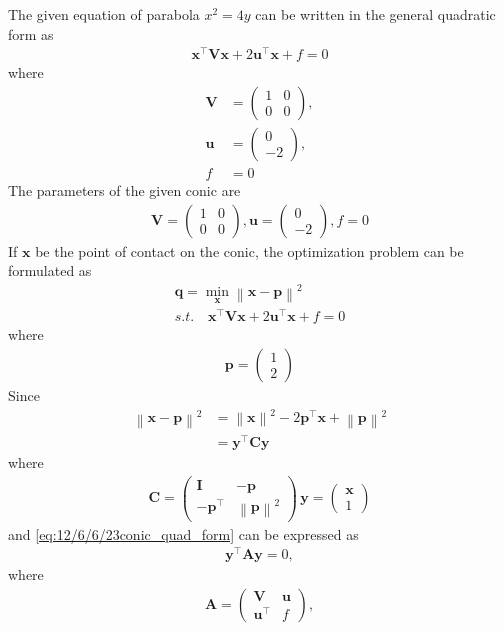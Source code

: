 \documentclass[journal,10pt,twocolumn]{article}
\providecommand{\norm}[1]{\left\lVert#1\right\rVert}
\let\vec\mathbf
\newcommand{\myvec}[1]{\ensuremath{\begin{pmatrix}#1\end{pmatrix}}}
\begin{document}
The given equation of parabola $x^2 = 4y$ can be written in the general quadratic form as
\begin{align}
    \label{eq:conic_quad_form}
    \vec{x}^{\top}\vec{V}\vec{x}+2\vec{u}^{\top}\vec{x}+f=0
    \end{align}
where
\begin{align}
	\label{eq:V_matrix}
	\vec{V} &= \myvec{1 & 0\\0 & 0},
	\\
	\label{eq:u_vector}
	\vec{u} &= \myvec{0\\-2},
	\\
	\label{eq:f_value}
	f &=0
\end{align}
\fi
The parameters of the given conic are
\begin{align}
	\label{eq:12/6/6/23V_matrix}
	\vec{V} = \myvec{1 & 0\\0 & 0},
	\vec{u} = \myvec{0\\-2},
	f =0
\end{align}
If $\vec{x}$ be the point of contact on the conic, the optimization problem can be formulated as 
\begin{align}
	\label{eq:12/6/6/23/quad}
	\vec{q} = \min_{\vec{x}}\norm{\vec{x}-\vec{p}}^2
	\\
	s.t. \quad 
    \vec{x}^{\top}\vec{V}\vec{x}+2\vec{u}^{\top}\vec{x}+f=0
    \label{eq:12/6/6/23conic_quad_form}
\end{align}
%
where 
\begin{align}
	\vec{p} = \myvec{1 \\ 2}
\end{align}
Since 
\begin{align}
	\norm{\vec{x}-\vec{p}}^2 &= 
	\norm{\vec{x}}^2 - 2\vec{p}^{\top}\vec{x} + \norm{\vec{p}}^2
	\\
	&= 
\vec{y}^{\top}\vec{C}\vec{y}
\end{align}
	where
\begin{align}
	\vec{C} = \myvec{\vec{I}&-\vec{p}\\ -\vec{p}^{\top}& \norm{\vec{p}}^2}\, \vec{y} = \myvec{\vec{x}\\1}
\end{align}
and 
    \eqref{eq:12/6/6/23conic_quad_form} can be expressed as 
\begin{align}
    \vec{y}^{\top}\vec{A}\vec{y}=0,
\end{align}
where
\begin{align}
\vec{A} = \myvec{\vec{V}&\vec{u}\\\vec{u}^{\top}&f},
\end{align}
\end{document}
